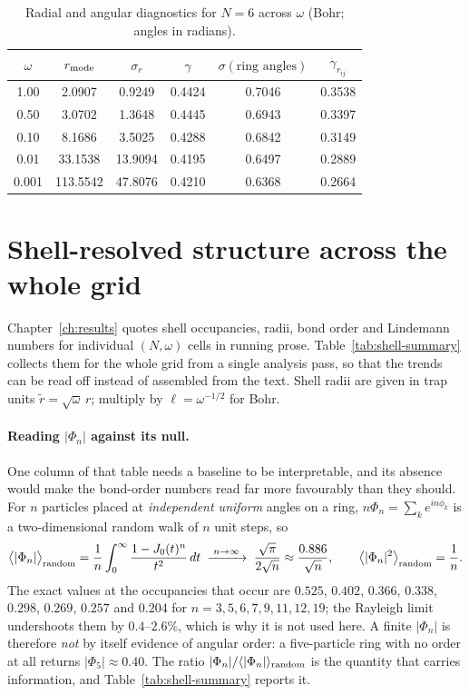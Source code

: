 \begin{table}[H]
\centering
\caption{Radial and angular diagnostics for $N{=}6$ across $\omega$
(Bohr; angles in radians).}
\label{tab:N6}
\begin{tabular}{c|ccccc}
\toprule
$\omega$ & $r_{\rm mode}$ & $\sigma_r$ & $\gamma$
& $\sigma(\text{ring angles})$ & $\gamma_{r_{ij}}$ \\
\midrule
1.00  & 2.0907   & 0.9249  & 0.4424 & 0.7046 & 0.3538 \\
0.50  & 3.0702   & 1.3648  & 0.4445 & 0.6943 & 0.3397 \\
0.10  & 8.1686   & 3.5025  & 0.4288 & 0.6842 & 0.3149 \\
0.01  & 33.1538  & 13.9094 & 0.4195 & 0.6497 & 0.2889 \\
0.001 & 113.5542 & 47.8076 & 0.4210 & 0.6368 & 0.2664 \\
\bottomrule
\end{tabular}
\end{table}

\section{Shell-resolved structure across the whole grid}
\label{app:structural-tables:shells}

Chapter~\ref{ch:results} quotes shell occupancies, radii, bond order and Lindemann
numbers for individual $(N,\omega)$ cells in running prose. Table~\ref{tab:shell-summary}
collects them for the whole grid from a single analysis pass, so that the trends can be read off instead of assembled from the text. Shell radii are given in trap units
$\tilde r=\sqrt{\omega}\,r$; multiply by $\ell=\omega^{-1/2}$ for Bohr.

\paragraph{Reading $|\Phi_n|$ against its null.}
One column of that table needs a baseline to be interpretable, and its absence would
make the bond-order numbers read far more favourably than they should. For $n$ particles
placed at \emph{independent uniform} angles on a ring, $n\Phi_n=\sum_k e^{in\phi_k}$
is a two-dimensional random walk of $n$ unit steps, so
\begin{equation}
  \big\langle|\Phi_n|\big\rangle_{\rm random}=\frac1n\int_0^\infty\frac{1-J_0(t)^n}{t^2}\,dt
  \;\xrightarrow{\;n\to\infty\;}\;\frac{\sqrt\pi}{2\sqrt n}\approx\frac{0.886}{\sqrt n},
  \qquad
  \big\langle|\Phi_n|^2\big\rangle_{\rm random}=\frac1n .
  \label{eq:phi-null}
\end{equation}
The exact values at the occupancies that occur are $0.525$, $0.402$, $0.366$, $0.338$,
$0.298$, $0.269$, $0.257$ and $0.204$ for $n=3,5,6,7,9,11,12,19$; the Rayleigh limit
undershoots them by $0.4$--$2.6\%$, which is why it is not used here.
A finite $|\Phi_n|$ is therefore \emph{not} by itself evidence of angular order: a
five-particle ring with no order at all returns $|\Phi_5|\approx0.40$. The ratio
$|\Phi_n|/\langle|\Phi_n|\rangle_{\rm random}$ is the quantity that carries information, and
Table~\ref{tab:shell-summary} reports it.

